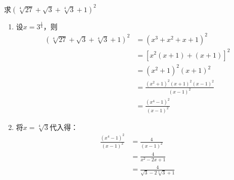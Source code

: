 \documentclass[answers]{exam}
\begin{document}
\begin{questions}
	\question 求$(\sqrt[4]{27} + \sqrt{3} + \sqrt[4]{3} + 1)^2$

	\begin{solution}
		\begin{enumerate}
			\item 设$\displaystyle x=3^{\frac{1}{4}}$，则
			      \begin{align}
				      (\sqrt[4]{27} + \sqrt{3} + \sqrt[4]{3} + 1)^2 & = (x^3 + x^2 + x + 1)^2                     \\
				                                                    & = [x^2(x+1) + (x+1)]^2                      \\
				                                                    & = (x^2 + 1)^2(x+1)^2                        \\
				                                                    & = \frac{(x^2 + 1)^2(x+1)^2(x-1)^2}{(x-1)^2} \\
				                                                    & = \frac{(x^4 - 1)^2}{(x-1)^2}
			      \end{align}
			\item 将$x=\sqrt[4]{3}$代入得：
			      \begin{align}
				      \frac{(x^4 - 1)^2}{(x-1)^2} & = \frac{4}{(x-1)^2}                     \\
				                                  & = \frac{4}{x^2 - 2x + 1}                \\
				                                  & = \frac{4}{\sqrt{3} - 2\sqrt[4]{3} + 1}
			      \end{align}
		\end{enumerate}
	\end{solution}
\end{questions}
\end{document}
